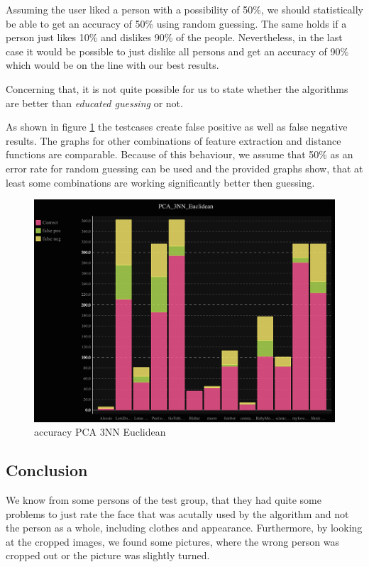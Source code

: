 \documentclass{report}
\begin{document}
Assuming the user liked a person with a possibility of 50\%, we should statistically be able to get an accuracy of 50\% using random guessing.
The same holds if a person just likes 10\% and dislikes 90\% of the people.
Nevertheless, in the last case it would be possible to just dislike all persons and get an accuracy of 90\% which would be on the line with our best results.

Concerning that, it is not quite possible for us to state whether the algorithms are better than \emph{educated guessing} or not.

As shown in figure \ref{fig:bargraph-pca} the testcases create false positive as well as false negative results.
The graphs for other combinations of feature extraction and distance functions are comparable.
Because of this behaviour, we assume that 50\% as an error rate for random guessing can be used and the provided graphs show, that at least some combinations are working significantly better then guessing.

\begin{figure}[!htb]
  \centering
  \includegraphics[scale=0.08]{images/PCA_3NN_Euclidean_nonvote.png}
  \caption{accuracy PCA 3NN Euclidean}
  \label{fig:bargraph-pca}
\end{figure}

\clearpage

\subsection{Conclusion}
We know from some persons of the test group, that they had quite some problems to just rate the face that was acutally used by the algorithm and not the person as a whole, including clothes and appearance.
Furthermore, by looking at the cropped images, we found some pictures, where the wrong person was cropped out or the picture was slightly turned.
\end{document}
